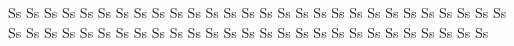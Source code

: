 \documentclass{worksheet}
\begin{document}
\begin{drillsheet}
\calligra
Ss Ss Ss Ss Ss Ss Ss Ss Ss Ss Ss Ss Ss Ss Ss Ss Ss Ss Ss Ss Ss Ss Ss Ss Ss Ss Ss Ss Ss Ss Ss Ss Ss Ss Ss Ss Ss Ss Ss Ss Ss Ss Ss Ss Ss Ss Ss Ss Ss Ss Ss Ss Ss Ss Ss
\end{drillsheet}
\end{document}
